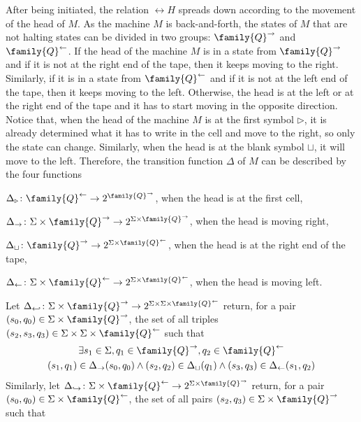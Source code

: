 \documentclass{lmcs}
\begin{document}
After being initiated, the relation $\rel{H}$ spreads down according to the movement of the head of $M$.
As the machine $M$ is back-and-forth, the states of $M$ that are not halting states can be divided in two groups: $\family{Q}^\rightarrow$ and $\family{Q}^\leftarrow$.
If the head of the machine $M$ is in a state from $\family{Q}^\rightarrow$ and if it is not at the right end of the tape, then it keeps moving to the right.
Similarly, if it is in a state from $\family{Q}^\leftarrow$ and if it is not at the left end of the tape, then it keeps moving to the left.
Otherwise, the head is at the left or at the right end of the tape and it has to start moving in the opposite direction.
Notice that, when the head of the machine $M$ is at the first symbol $\triangleright$, it is already determined what it has to write in the cell and move to the right, so only the state can change.
Similarly, when the head is at the blank symbol $\sqcup$, it will move to the left.
Therefore, the transition function $\Delta$ of $M$ can be described by the four functions
\begin{compactenum}[(a)]
  \item $\Delta_\triangleright\colon \family{Q}^\leftarrow \to 2^{\family{Q}^\rightarrow}$, when the head is at the first cell,
  \item $\Delta_\rightarrow\colon \Sigma\times\family{Q}^\rightarrow \to 2^{\Sigma\times\family{Q}^\rightarrow}$, when the head is moving right,
  \item $\Delta_\sqcup\colon \family{Q}^\rightarrow \to 2^{\Sigma\times\family{Q}^\leftarrow}$, when the head is at the right end of the tape,
  \item $\Delta_\leftarrow\colon \Sigma\times\family{Q}^\leftarrow \to 2^{\Sigma\times\family{Q}^\leftarrow}$, when the head is moving left.
\end{compactenum}
Let $\Delta_{\hookleftarrow}\colon \Sigma\times\family{Q}^\rightarrow\to 2^{\Sigma\times\Sigma\times\family{Q}^\leftarrow}$ return, for a pair $(s_0,q_0)\in\Sigma\times\family{Q}^\rightarrow$, the set of all triples $(s_2,s_3,q_3)\in\Sigma\times\Sigma\times\family{Q}^\leftarrow$ such that
\begin{multline}
\exists s_1\in\Sigma, q_1\in\family{Q}^\rightarrow,q_2\in\family{Q}^\leftarrow \\ (s_1,q_1)\in\Delta_\rightarrow(s_0,q_0)\wedge (s_2,q_2)\in\Delta_\sqcup(q_1)\wedge(s_3,q_3)\in\Delta_\leftarrow(s_1,q_2)
\end{multline}
Similarly, let $\Delta_{\hookrightarrow}\colon \Sigma\times\family{Q}^\leftarrow\to 2^{\Sigma\times\family{Q}^\rightarrow}$ return, for a pair $(s_0,q_0)\in\Sigma\times\family{Q}^\leftarrow$, the set of all pairs $(s_2,q_3)\in\Sigma\times\family{Q}^\rightarrow$ such that
\end{document}
